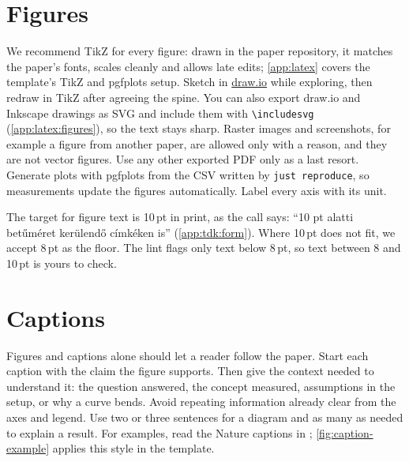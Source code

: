 \section{Figures}\label{app:writing:figures}
We recommend TikZ for every figure: drawn in the paper repository, it matches the paper's fonts, scales cleanly and allows late edits; \cref{app:latex} covers the template's TikZ and pgfplots setup. Sketch in \href{https://www.drawio.com/}{draw.io} while exploring, then redraw in TikZ after agreeing the spine. You can also export draw.io and Inkscape drawings as SVG and include them with \texttt{\textbackslash includesvg} (\cref{app:latex:figures}), so the text stays sharp. Raster images and screenshots, for example a figure from another paper, are allowed only with a reason, and they are not vector figures. Use any other exported PDF only as a last resort. Generate plots with pgfplots from the CSV written by \texttt{just reproduce}, so measurements update the figures automatically. Label every axis with its unit.

The target for figure text is 10\,pt in print, as the call says: \enquote{10 pt alatti betűméret kerülendő címkéken is} (\cref{app:tdk:form}). Where 10\,pt does not fit, we accept 8\,pt as the floor. The lint flags only text below 8\,pt, so text between 8 and 10\,pt is yours to check.

\section{Captions}\label{app:writing:captions}
Figures and captions alone should let a reader follow the paper. Start each caption with the claim the figure supports. Then give the context needed to understand it: the question answered, the concept measured, assumptions in the setup, or why a curve bends. Avoid repeating information already clear from the axes and legend. Use two or three sentences for a diagram and as many as needed to explain a result. For examples, read the Nature captions in \citet{guide:gulyas2015navigable}; \cref{fig:caption-example} applies this style in the template.

